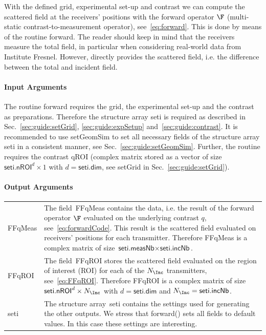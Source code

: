 \documentclass[a4paper]{article}
\begin{document}
With the defined grid, experimental set-up and contrast we can compute the scattered field at the receivers' positions with the forward operator $\F$ (multi-static contrast-to-measurement operator), see~\eqref{eq:forward}. This is done by means of the routine \textsf{forward}. The reader should keep in mind that the receivers measure the total field, in particular when considering real-world data from Institute Fresnel. However, \IPscatt directly provides the scattered field, i.e. the difference between the total and incident field.

\paragraph{Input Arguments} The routine \textsf{forward} requires the grid, the experimental set-up and the contrast as preparations. Therefore the structure array \textsf{seti} is required as described in Sec.~\ref{sec:guide:setGrid}, \ref{sec:guide:expSetup} and~\ref{sec:guide:contrast}. It is recommended to use \textsf{setGeomSim} to set all necessary fields of the structure array \textsf{seti} in a consistent manner, see Sec.~\ref{sec:guide:setGeomSim}. Further, the routine requires the contrast \textsf{qROI} (complex matrix stored as a vector of size $\textsf{seti.nROI}^d \times 1$ with $d = \textsf{seti.dim}$, see \textsf{setGrid} in Sec.~\ref{sec:guide:setGrid}).

\paragraph{Output Arguments} \hfill

\noindent\begin{tabular}[t]{p{1.5cm} p{14.1cm}}
\textsf{FFqMeas} & The field~\textsf{FFqMeas} contains the data, i.e. the result of the forward operator $\F$ evaluated on the underlying contrast $q$, see~\eqref{eq:forwardCode}. This result is the scattered field evaluated on receivers' positions for each transmitter. Therefore \textsf{FFqMeas} is a complex matrix of size $\textsf{seti.measNb} \times \textsf{seti.incNb}$.\\
\textsf{FFqROI}  & The field~\textsf{FFqROI} stores the scattered field evaluated on the region of interest (ROI) for each of the $N_\Inc$ transmitters, see~\eqref{eq:FFqROI}. Therefore \textsf{FFqROI} is a complex matrix of size $\textsf{seti.nROI}^d \times N_\Inc$ with $d = \textsf{seti.dim}$ and $N_\Inc = \textsf{seti.incNb}$.\\
\textsf{seti}    & The structure array~\textsf{seti} contains the settings used for generating the other outputs. We stress that \textsf{forward()} sets all fields to default values. In this case these settings are interesting.
\end{tabular}
\end{document}
